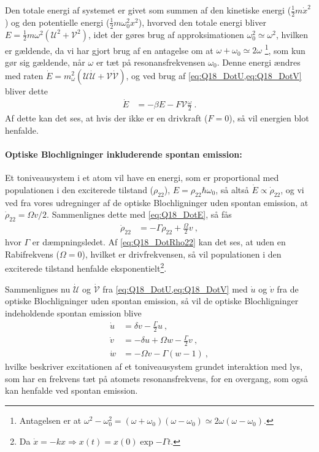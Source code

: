 Den totale energi af systemet er givet som summen af den kinetiske energi ($\frac{1}{2}m\Dot{x}^2$) og den potentielle energi ($\frac{1}{2}m\omega_0^2x^2$), hvorved den totale energi bliver $E = \frac{1}{2}m\omega^2(\mathcal{U}^2 + \mathcal{V}^2)$, idet der gøres brug af approksimationen $\omega_0^2 \simeq \omega^2$, hvilken er gældende, da vi har gjort brug af en antagelse om at $\omega + \omega_0 \simeq 2\omega$ \footnote{Antagelsen er at $\omega^2 - \omega_0^2 = (\omega + \omega_0)(\omega - \omega_0) \simeq 2\omega(\omega - \omega_0)$.}, som kun gør sig gældende, når $\omega$ er tæt på resonansfrekvensen $\omega_0$. Denne energi ændres med raten $\Dot{E} = m_\omega^2(\mathcal{U}\Dot{\mathcal{U}} + \mathcal{V}\Dot{\mathcal{V}})$, og ved brug af \cref{eq:Q18_DotU,eq:Q18_DotV} bliver dette
\begin{align} \label{eq:Q18_DotE}
    \Dot{E} &= -\beta E - F \mathcal{V}\frac{\omega}{2} \: .
\end{align}
Af dette kan det ses, at hvis der ikke er en drivkraft ($F = 0$), så vil energien blot henfalde.


\paragraph{Optiske Blochligninger inkluderende spontan emission:} Et toniveausystem i et atom vil have en energi, som er proportional med populationen i den exciterede tilstand ($\rho_{22}$), $E = \rho_{22}\hbar\omega_0$, så altså $\Dot{E} \propto \Dot{\rho}_{22}$, og vi ved fra vores udregninger af de optiske Blochligninger uden spontan emission, at $\Dot{\rho}_{22} = \Omega v/2$. Sammenlignes dette med \cref{eq:Q18_DotE}, så fås
\begin{align} \label{eq:Q18_DotRho22}
    \Dot{\rho}_{22} &= -\Gamma\rho_{22} + \frac{\Omega}{2}v \: ,
\end{align}
hvor $\Gamma$ er dæmpningsledet. Af \cref{eq:Q18_DotRho22} kan det ses, at uden en Rabifrekvens ($\Omega = 0$), hvilket er drivfrekvensen, så vil populationen i den exciterede tilstand henfalde eksponentielt\footnote{Da $\Dot{x} = -kx \Rightarrow x(t) = x(0)\exp{-\Gamma t}$.}.

Sammenlignes nu $\Dot{\mathcal{U}}$ og $\Dot{\mathcal{V}}$ fra \cref{eq:Q18_DotU,eq:Q18_DotV} med $\Dot{u}$ og $\Dot{v}$ fra de optiske Blochligninger uden spontan emission, så vil de \textsf{optiske Blochligninger} indeholdende spontan emission blive
\begin{align}
    \Dot{u} &= \delta v - \frac{\Gamma}{2}u \: , \label{eq:Q18_DotLilleU} \\
    \Dot{v} &= -\delta u + \Omega w - \frac{\Gamma}{2}v \: , \label{eq:Q18_DotLilleV} \\
    \Dot{w} &= -\Omega v - \Gamma(w - 1) \: , \label{eq:Q18_DotLilleW}
\end{align}
hvilke beskriver excitationen af et toniveausystem grundet interaktion med lys, som har en frekvens tæt på atomets resonansfrekvens, for en overgang, som også kan henfalde ved spontan emission.

